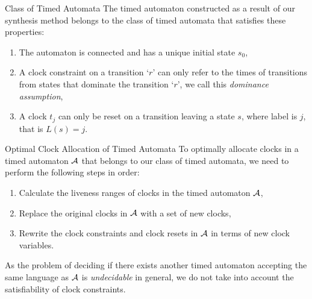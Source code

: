 \documentclass[10pt]{beamer}
\theoremstyle{plain}
\theoremstyle{definition}
\begin{document}
\begin{frame}{Class of Timed Automata}
The timed automaton constructed as a result of our synthesis method belongs to the class of timed automata that satisfies these properties:
	\begin{enumerate}
		\item{The automaton is connected and has a unique initial state $s_0$,}%
		\item{A clock constraint on a transition `$r$' can only refer to the times of transitions from states that dominate the transition `$r$', we call this \textit{dominance assumption}},
		\item{A clock $t_j$ can only be reset on a transition leaving a state $s$, where label is $j$, that is $L(s)=j$.}
	\end{enumerate}
\end{frame}

\begin{frame}{Optimal Clock Allocation of Timed Automata}
	To optimally allocate clocks in a timed automaton $\cal A$ that belongs to our class of timed automata, we need to perform the following steps in order:
	\begin{enumerate}
		\item{Calculate the liveness ranges of clocks in the timed automaton $\cal A$,}
		\item{Replace the original clocks in $\cal A$ with a set of new clocks,} %
		\item{Rewrite the clock constraints and clock resets in $\cal A$ in terms of new clock variables.}
	\end{enumerate}
	As the problem of deciding if there exists another timed automaton accepting the same language as $\cal A$ is \emph{undecidable} in general, we do not take into account the satisfiability of clock constraints.

\end{frame}
\end{document}
